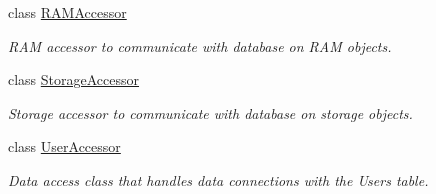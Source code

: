 \begin{DoxyCompactItemize}
class \hyperlink{class_data_access_1_1_r_a_m_accessor}{R\+A\+M\+Accessor}
\begin{DoxyCompactList}\small\item\em R\+AM accessor to communicate with database on R\+AM objects. \end{DoxyCompactList}\item 
class \hyperlink{class_data_access_1_1_storage_accessor}{Storage\+Accessor}
\begin{DoxyCompactList}\small\item\em Storage accessor to communicate with database on storage objects. \end{DoxyCompactList}\item 
class \hyperlink{class_data_access_1_1_user_accessor}{User\+Accessor}
\begin{DoxyCompactList}\small\item\em Data access class that handles data connections with the Users table. \end{DoxyCompactList}\end{DoxyCompactItemize}
